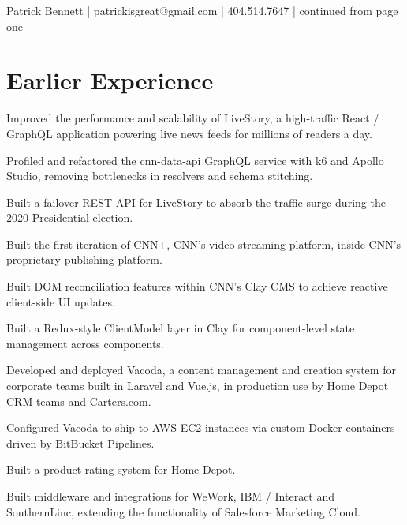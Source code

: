 \documentclass[]{pb-resume-openfonts}
\begin{document}
{\color{headings}\fontsize{10pt}{12pt}\selectfont
Patrick Bennett | patrickisgreat@gmail.com | 404.514.7647 | continued from page one\par}
\vspace{6pt}
\noindent\makebox[\linewidth]{\color{headings}\rule{\linewidth}{0.4pt}}
\vspace{4pt}

\section{Earlier Experience}

\vspace{\topsep}
\begin{tightemize}
\item Improved the performance and scalability of LiveStory, a high-traffic React / GraphQL application powering live news feeds for millions of readers a day.
\item Profiled and refactored the cnn-data-api GraphQL service with k6 and Apollo Studio, removing bottlenecks in resolvers and schema stitching.
\item Built a failover REST API for LiveStory to absorb the traffic surge during the 2020 Presidential election.
\item Built the first iteration of CNN+, CNN's video streaming platform, inside CNN's proprietary publishing platform.
\item Built DOM reconciliation features within CNN's Clay CMS to achieve reactive client-side UI updates.
\item Built a Redux-style ClientModel layer in Clay for component-level state management across components.
\end{tightemize}
\sectionsep

\begin{tightemize}
\item Developed and deployed Vacoda, a content management and creation system for corporate teams built in Laravel and Vue.js, in production use by Home Depot CRM teams and Carters.com.
\item Configured Vacoda to ship to AWS EC2 instances via custom Docker containers driven by BitBucket Pipelines.
\item Built a product rating system for Home Depot.
\item Built middleware and integrations for WeWork, IBM / Interact and SouthernLinc, extending the functionality of Salesforce Marketing Cloud.
\end{tightemize}
\sectionsep
\end{document}
